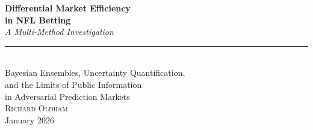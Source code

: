 \begin{titlepage}
\centering
\vspace*{3.5cm}

{\fontsize{26}{32}\selectfont\bfseries\color{black}%
Differential Market Efficiency\\[0.3em]
in NFL Betting}\\[0.8cm]

{\fontsize{16}{20}\selectfont\itshape\color{black!85}%
A Multi-Method Investigation}\\[1.8cm]

{\color{accentBlue}\rule{5cm}{0.8pt}}\\[1.8cm]

{\fontsize{12}{16}\selectfont\color{black!80}%
Bayesian Ensembles, Uncertainty Quantification,\\[0.4em]
and the Limits of Public Information\\[0.4em]
in Adversarial Prediction Markets}\\[3cm]

{\fontsize{14}{18}\selectfont\scshape Richard Oldham}\\[1cm]

{\fontsize{12}{14}\selectfont January 2026}

\vfill


\end{titlepage}
